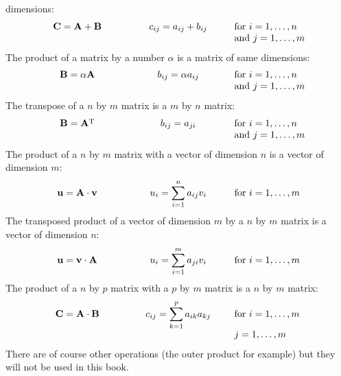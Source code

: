 \documentclass[twoside]{book}
\begin{document}
dimensions:
\begin{equation}
\begin{tabular}{ccc}
  \relboxc{0.27}{${\bf C}={\bf A}+{\bf B}$}&\relboxc{0.27}{$c_{ij}=a_{ij}+b_{ij}$}&\relboxl{0.27}{for $i=1,\ldots,n$}\\
  &&\relboxl{0.27}{and $j=1,\ldots,m$}\\
\end{tabular}
\end{equation}
The product of a matrix by a number $\alpha$ is a matrix of same
dimensions:
\begin{equation}
\begin{tabular}{ccc}
  \relboxc{0.27}{${\bf B}=\alpha{\bf A}$}&\relboxc{0.27}{$b_{ij}=\alpha a_{ij}$}&\relboxl{0.27}{for $i=1,\ldots,n$}\\
  &&\relboxl{0.27}{and $j=1,\ldots,m$}\\
\end{tabular}
\end{equation}
The transpose of a $n$ by $m$ matrix is a $m$ by $n$ matrix:
\begin{equation}
\begin{tabular}{ccc}
  \relboxc{0.27}{${\bf B}={\bf A}^{\mathop{\rm T}}$}&\relboxc{0.27}{$b_{ij}=a_{ji}$}&\relboxl{0.27}{for $i=1,\ldots,n$}\\
  &&\relboxl{0.27}{and $j=1,\ldots,m$}\\
\end{tabular}
\end{equation}
The product of a $n$ by $m$ matrix with a vector of dimension $n$
is a vector of dimension $m$:
\begin{equation}
\begin{tabular}{ccc}
  \relboxc{0.27}{${\bf u}={\bf A}\cdot{\bf v}$}&\relboxc{0.27}{$u_i=\displaystyle\sum_{i=1}^n a_{ij}v_i$}&\relboxl{0.27}{for $i=1,\ldots,m$}\\
\end{tabular}
\end{equation}
The transposed product of a vector of dimension $m$ by a $n$ by
$m$ matrix is a vector of dimension $n$:
\begin{equation}
\begin{tabular}{ccc}
  \relboxc{0.27}{${\bf u}={\bf v}\cdot{\bf A}$}&\relboxc{0.27}{$u_i=\displaystyle\sum_{i=1}^m a_{ji}v_i$}&\relboxl{0.27}{for $i=1,\ldots,m$}\\
\end{tabular}
\end{equation}
The product of a $n$ by $p$ matrix with a $p$ by $m$ matrix is a
$n$ by $m$ matrix:
\begin{equation}
\label{eq:matrixproduct}
\begin{tabular}{ccc}
  \relboxc{0.27}{${\bf C}={\bf A}\cdot{\bf B}$}&\relboxc{0.27}{$c_{ij}=\displaystyle\sum_{k=1}^p a_{ik}a_{kj}$}&\relboxl{0.27}{for $i=1,\ldots,m$}\\
  &&\relboxl{0.27}{$j=1,\ldots,m$}\\
\end{tabular}
\end{equation}
There are of course other operations (the outer product for
example) but they will not be used in this book.
\end{document}
